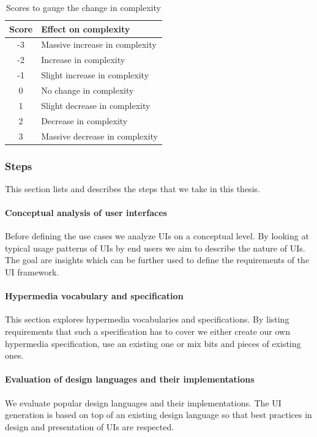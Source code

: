 \begin{table}[]
  \begin{center}
    \begin{tabular}{|c|l|}
      \hline
      Score & Effect on complexity \\
      \hline
      -3 & Massive increase in complexity \\
      -2 & Increase in complexity \\
      -1 & Slight increase in complexity \\
      0 & No change in complexity \\
      1 & Slight decrease in complexity \\
      2 & Decrease in complexity \\
      3 & Massive decrease in complexity \\
      \hline
    \end{tabular}
    \caption{Scores to gauge the change in complexity}
  \end{center}
\end{table}

\subsubsection{Steps}
This section lists and describes the steps that we take in this thesis.

\paragraph{Conceptual analysis of user interfaces}
Before defining the use cases we analyze UIs on a conceptual level. By looking at typical usage patterns of UIs by end users we aim to describe the nature of UIs. The goal are insights which can be further used to define the requirements of the UI framework.

\paragraph{Hypermedia vocabulary and specification}
This section explores hypermedia vocabularies and specifications. By listing requirements that such a specification has to cover we either create our own hypermedia specification, use an existing one or mix bits and pieces of existing ones.

\paragraph{Evaluation of design languages and their implementations}
We evaluate popular design languages and their implementations. The UI generation is based on top of an existing design language so that best practices in design and presentation of UIs are respected.

